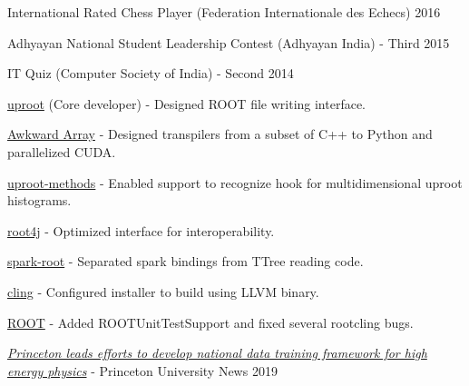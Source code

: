 \documentclass[10pt, letterpaper]{fulldeps}
\begin{document}
\begin{tightitemize}
    \item International Rated Chess Player (Federation Internationale des Echecs) \hfill{2016}
    \item Adhyayan National Student Leadership Contest (Adhyayan India) - Third \hfill{2015}
    \item IT Quiz (Computer Society of India) - Second \hfill{2014}
\end{tightitemize}

\begin{tightitemize}
\item {\href{https://github.com/scikit-hep/uproot}{uproot}} (Core developer) - Designed ROOT file writing interface.
\item {\href{https://github.com/scikit-hep/awkward-1.0}{Awkward Array}} - Designed transpilers from a subset of C++ to Python and parallelized CUDA.
\item {\href{https://github.com/scikit-hep/uproot-methods}{uproot-methods}} - Enabled support to recognize hook for multidimensional uproot histograms.
\item {\href{https://github.com/diana-hep/root4j}{root4j}} - Optimized interface for interoperability.
\item {\href{https://github.com/diana-hep/spark-root}{spark-root}} - Separated spark bindings from TTree reading code.
\item {\href{https://github.com/root-project/cling}{cling}} - Configured installer to build using LLVM binary.
\item {\href{https://github.com/root-project/root}{ROOT}} - Added ROOTUnitTestSupport and fixed several rootcling bugs.
\end{tightitemize}

\begin{tightitemize}
\item \textit{\href{https://www.princeton.edu/news/2019/08/19/princeton-leads-efforts-develop-national-data-training-framework-high-energy}{Princeton leads efforts to develop national data training framework for high energy physics}} - Princeton University News \hfill{2019}
\end{tightitemize}
\end{document}
